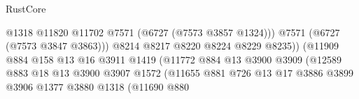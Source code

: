 \begin{lexlean}{RustCore}
\begin{coremodule}
                                                      @1318
                                                      @11820
                                                      @11702
                                                      @7571
                                                      (@6727 (@7573 @3857 @1324)))
                                                    @7571
                                                    (@6727 (@7573 @3847 @3863)))
                                                  @8214
                                                  @8217
                                                  @8220
                                                  @8224
                                                  @8229
                                                  @8235))
                                              (@11909
                                                @884
                                                @158
                                                @13
                                                @16
                                                @3911
                                                @1419
                                                (@11772
                                                  @884
                                                  @13
                                                  @3900
                                                  @3909
                                                  (@12589
                                                    @883
                                                    @18
                                                    @13
                                                    @3900
                                                    @3907
                                                    @1572
                                                    (@11655
                                                      @881
                                                      @726
                                                      @13
                                                      @17
                                                      @3886
                                                      @3899
                                                      @3906
                                                      @1377
                                                      @3880
                                                      @1318
                                                      (@11690
                                                        @880

\end{coremodule}
\end{lexlean}
